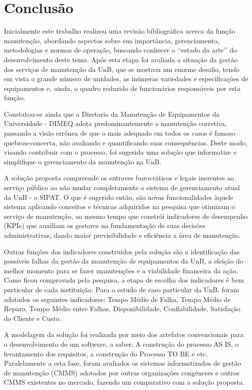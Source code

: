 \chapter{Conclusão}

Inicialmente este trabalho realizou uma revisão bibliográfica acerca da função manutenção, abordando aspectos sobre sua importância, gerenciamento, metodologias e normas de operação, buscando conhecer o {\lq\lq estado da arte\rq\rq} do desenvolvimento deste tema. Após esta etapa foi avaliada a situação da gestão dos serviços de manutenção da UnB, que se mostrou um enorme desafio, tendo em vista o grande número de unidades, as inúmeras variedades e especificações de equipamentos e, ainda, o quadro reduzido de funcionários responsáveis por esta função.

Constatou-se ainda que a Diretoria da Manutenção de Equipamentos da Universidade - DIMEQ adota predominantemente a manutenção corretiva, passando a visão errônea de que o mais adequado em todos os casos é famoso quebrou-concerta, não avaliando e quantificando suas consequências. Deste modo, visando contribuir com o processo, foi sugerida uma solução que informatize e simplifique o gerenciamento da manutenção na UnB.

A solução proposta compreende os entraves burocráticos e legais inerentes ao serviço público ao não mudar completamente o sistema de gerenciamento atual da UnB - o SIPAT. O que é sugerido então, são novas funcionalidades àquele sistema aplicando conceitos e técnicas adquiridos na pesquisa que otimizam o serviço de manutenção, ao mesmo tempo que constrói indicadores de desempenho (KPIs) que auxiliam os gestores na fundamentação de suas decisões administrativas, dando maior previsibilidade e eficiência a área de manutenção.

Outras funções dos indicadores construídos pela solução são a identificação das possíveis falhas da gestão da manutenção de equipamentos da UnB, a eleição do melhor momento para se fazer manutenções e a viabilidade financeira da ação. Como ficou comprovada pela pesquisa, a etapa de escolha dos indicadores é bem particular de cada instituição. Para o estudo de caso particular da UnB, foram adotados os seguintes indicadores: Tempo Médio de Falha, Tempo Médio de Reparo, Tempo Médio entre Falhas, Disponibilidade, Confiabilidade, Satisfação do Cliente e Custo.

A modelagem da solução foi realizada por meio dos artefatos convencionais para o desenvolvimento de um software, a saber: A construção do processo AS IS, o levantamento dos requisitos, a construção do Processo TO BE e etc. Paralelamente a esta fase, foram avaliados os sistemas informatizados de gestão de manutenção (CMMS) adotados por outras organizações congêneres e outros CMMS existentes no mercado, fazendo um comparativo com a solução proposta.

